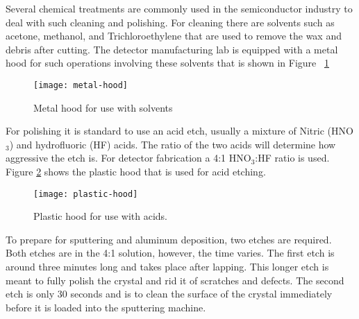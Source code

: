 Several chemical treatments are commonly used in the semiconductor industry to deal with such cleaning and polishing.
For cleaning there are solvents such as acetone, methanol, and Trichloroethylene that are used to remove the wax and debris after cutting.
The detector manufacturing lab is equipped with a metal hood for such operations involving these solvents that is shown in Figure ~\ref{fig:metalhood}
\begin{figure}[htpb]
\centering
\texttt{[image: metal-hood]}
\caption{Metal hood for use with solvents}
\label{fig:metalhood}
\end{figure}

For polishing it is standard to use an acid etch, usually a mixture of Nitric (HNO$_3$) and hydrofluoric (HF) acids.
The ratio of the two acids will determine how aggressive the etch is.
For detector fabrication a 4:1 HNO$_3$:HF ratio is used.
Figure \ref{fig:plastichood} shows the plastic hood that is used for acid etching.
\begin{figure}[htpb]
\centering
\texttt{[image: plastic-hood]}
\caption{Plastic hood for use with acids.}
\label{fig:plastichood}
\end{figure}
To prepare for sputtering and aluminum deposition, two etches are required.
Both etches are in the 4:1 solution, however, the time varies.
The first etch is around three minutes long and takes place after lapping.
This longer etch is meant to fully polish the crystal and rid it of scratches and defects.
The second etch is only 30 seconds and is to clean the surface of the crystal immediately before it is loaded into the sputtering machine.

